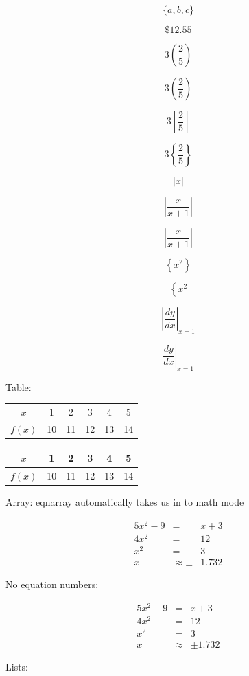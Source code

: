 \documentclass[11pt]{article}
\begin{document}
$$\{a,b,c\}$$

$$\$12.55$$

$$3(\frac{2}{5})$$

$$3\left(\frac{2}{5}\right)$$

$$3\left[\frac{2}{5}\right]$$

$$3\left\{\frac{2}{5}\right\}$$

$$|x|$$

$$|\frac{x}{x+1}|$$

$$\left| \frac{x}{x+1} \right|$$

$$\left\{ x^2 \right\}$$

$$\left\{ x^2 \right.$$

$$\left| \frac{dy}{dx} \right|_{x = 1}$$

$$\left. \frac{dy}{dx} \right|_{x = 1}$$

Table:

\begin{tabular}{cccccc}

$x$ & 1 & 2 & 3 & 4 & 5 \\
$f(x)$ & 10 & 11 & 12 & 13 & 14

\end{tabular}


\begin{tabular}{|c|c|c|c|c|c|}
\hline
$x$ & 1 & 2 & 3 & 4 & 5 \\ \hline
$f(x)$ & 10 & 11 & 12 & 13 & 14 \\ \hline

\end{tabular}

Array: eqnarray automatically takes us in to math mode

\begin{eqnarray}
5x^2-9 &=& x+3 \\ 
4x^2 &=& 12 \\ 
x^2 &=& 3 \\ 
x &\approx \pm& 1.732
\end{eqnarray}

No equation numbers:

\begin{eqnarray*}
5x^2-9 &=& x+3 \\ 
4x^2 &=& 12 \\ 
x^2 &=& 3 \\ 
x &\approx& \pm 1.732
\end{eqnarray*}

Lists:
\end{document}
